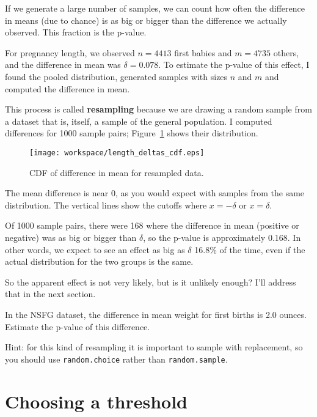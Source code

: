 \documentclass[10pt]{book}
\begin{document}
If we generate a large number of samples, we can count how often the
difference in means (due to chance) is as big or bigger than the
difference we actually observed.  This fraction is the p-value.

For pregnancy length, we observed $n=4413$ first babies and $m=4735$
others, and the difference in mean was $\delta=0.078$.  To estimate
the p-value of this effect, I found the pooled distribution, generated
samples with sizes $n$ and $m$ and computed the difference in mean.

This process is called {\bf resampling} because we are drawing a
random sample from a dataset that is, itself, a sample of the general
population.  I computed differences for 1000 sample pairs;
Figure~\ref{length_deltas_cdf} shows their distribution.

\begin{figure}
\centerline{\texttt{[image: workspace/length\_deltas\_cdf.eps]}}
\caption{CDF of difference in mean for resampled data.}
\label{length_deltas_cdf}
\end{figure}

The mean difference is near 0, as you would expect with samples
from the same distribution.  The vertical lines show the cutoffs where
$x=-\delta$ or $x=\delta$.

Of 1000 sample pairs, there were 168 where the difference in mean
(positive or negative) was as big or bigger than $\delta$, so the
p-value is approximately 0.168.  In other words, we expect to see an
effect as big as $\delta$ 16.8\% of the time,
even if the actual distribution for the two groups is the same.

So the apparent effect is not very likely, but is it unlikely enough?
I'll address that in the next section.

\begin{ex}

In the NSFG dataset, the difference in mean weight for first
births is 2.0 ounces.  Estimate the p-value of this difference.

Hint: for this kind of resampling it is important to sample
with replacement, so you should use {\tt random.choice} rather
than {\tt random.sample}.

\end{ex}


\section{Choosing a threshold}
\end{document}
